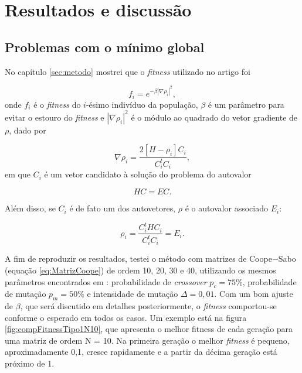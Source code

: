 \chapter{Resultados e discussão}
\label{cap:resultados}

\section{Problemas com o mínimo global}	
	
	No capítulo \ref{sec:metodo} mostrei que o \textit{fitness} utilizado no artigo \cite{metodo2004}  foi
	
	\begin{equation}
		\label{eq:fitnessGrad2}
		f_i = e^{-\beta |\nabla \rho_i|^2},
	\end{equation}
	onde $f_i$ é o \textit{fitness} do $i$-ésimo indivíduo da população, $\beta$ é um parâmetro para evitar o estouro do \textit{fitness} e $| \nabla \rho_i|^2$ é o módulo ao quadrado do vetor gradiente de $\rho$, dado por
		
				\begin{equation}
					\nabla \rho_i = \frac{2[H - \rho_i]C_i}{C_i^t C_i},
				\end{equation}
	em que $C_i$ é um vetor candidato à solução do problema do autovalor
	
	\begin{equation}
		HC = EC.
	\end{equation}
	
	Além disso, se $C_i$ é de fato um dos autovetores, $\rho$ é o autovalor associado $E_i$:
	
	\begin{equation}\label{eq:rho_eh_E}
		\rho_i = \frac{C_i^t H C_i}{C_i^t C_i} = E_i.
	\end{equation}
	
	A fim de reproduzir os resultados, testei o método com matrizes de Coope$-$Sabo (equação \ref{eq:MatrizCoope}) de ordem 10, 20, 30 e 40, utilizando os mesmos parâmetros encontrados em \cite{metodo2004}: probabilidade de \textit{crossover} $p_c = 75\%$, probabilidade de mutação $p_m = 50\%$ e intensidade de mutação $\Delta = 0,01$. Com um bom ajuste de $\beta$, que será discutido em detalhes posteriormente, o \textit{fitness} comportou-se conforme o esperado em todos os casos. Um exemplo está na figura \ref{fig:compFitnessTipo1N10}, que apresenta o melhor fitness de cada geração para uma matriz de ordem N = 10. Na primeira geração o melhor \textit{fitness} é pequeno, aproximadamente 0,1, cresce rapidamente e a partir da décima geração está próximo de 1.
	
